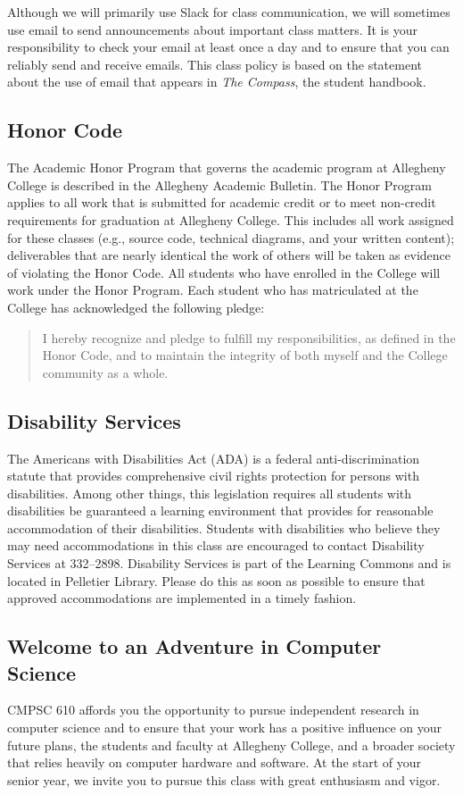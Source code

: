 \documentclass[11pt]{article}
\begin{document}
Although we will primarily use Slack for class communication, we will sometimes
use email to send announcements about important class matters. It is your
responsibility to check your email at least once a day and to ensure that you
can reliably send and receive emails. This class policy is based on the
statement about the use of email that appears in {\em The Compass}, the student
handbook.

\subsection*{Honor Code}

The Academic Honor Program that governs the academic program at Allegheny
College is described in the Allegheny Academic Bulletin. The Honor Program
applies to all work that is submitted for academic credit or to meet non-credit
requirements for graduation at Allegheny College. This includes all work
assigned for these classes (e.g., source code, technical diagrams, and your
written content); deliverables that are nearly identical the work of others will
be taken as evidence of violating the Honor Code. All students who have enrolled
in the College will work under the Honor Program. Each student who has
matriculated at the College has acknowledged the following pledge:

\begin{quote}
I hereby recognize and pledge to fulfill my responsibilities, as defined in the
Honor Code, and to maintain the integrity of both myself and the College
community as a whole.
\end{quote}

\subsection*{Disability Services}

The Americans with Disabilities Act (ADA) is a federal anti-discrimination
statute that provides comprehensive civil rights protection for persons with
disabilities. Among other things, this legislation requires all students with
disabilities be guaranteed a learning environment that provides for reasonable
accommodation of their disabilities. Students with disabilities who believe they
may need accommodations in this class are encouraged to contact Disability
Services at 332--2898. Disability Services is part of the Learning Commons and
is located in Pelletier Library. Please do this as soon as possible to ensure
that approved accommodations are implemented in a timely fashion.

\subsection*{Welcome to an Adventure in Computer Science}

CMPSC 610 affords you the opportunity to pursue independent research in computer
science and to ensure that your work has a positive influence on your future
plans, the students and faculty at Allegheny College, and a broader society that
relies heavily on computer hardware and software. At the start of your senior
year, we invite you to pursue this class with great enthusiasm and vigor.
\end{document}
